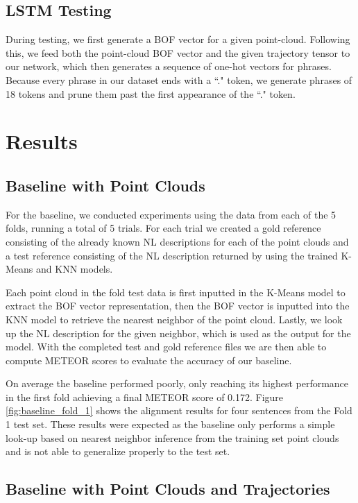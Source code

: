 \documentclass[letterpaper, 12 pt, conference]{ieeeconf}
\begin{document}
\subsection{LSTM Testing}

During testing, we first generate a BOF vector for a given point-cloud. Following this, we feed both the point-cloud BOF vector and the given trajectory tensor to our network, which then generates a sequence of one-hot vectors for phrases. Because every phrase in our dataset ends with a ``." token, we generate phrases of 18 tokens and prune them past the first appearance of the ``." token.  


\section{Results}

\subsection{Baseline with Point Clouds}\label{baseline_with_point_clouds}

For the baseline, we conducted experiments using the data from each of the 5 folds, running a total of 5 trials. For each trial we created a gold reference consisting of the already known NL descriptions for each of the point clouds and a test reference consisting of the NL description returned by using the trained K-Means and KNN models.

Each point cloud in the fold test data is first inputted in the K-Means model to extract the BOF vector representation, then the BOF vector is inputted into the KNN model to retrieve the nearest neighbor of the point cloud. Lastly, we look up the NL description for the given neighbor, which is used as the output for the model. With the completed test and gold reference files we are then able to compute METEOR scores to evaluate the accuracy of our baseline.

On average the baseline performed poorly, only reaching its highest performance in the first fold achieving a final METEOR score of 0.172. Figure \ref{fig:baseline_fold_1} shows the alignment results for four sentences from the Fold 1 test set. These results were expected as the baseline only performs a simple look-up based on nearest neighbor inference from the training set point clouds and is not able to generalize properly to the test set.

\subsection{Baseline with Point Clouds and Trajectories}
\end{document}
